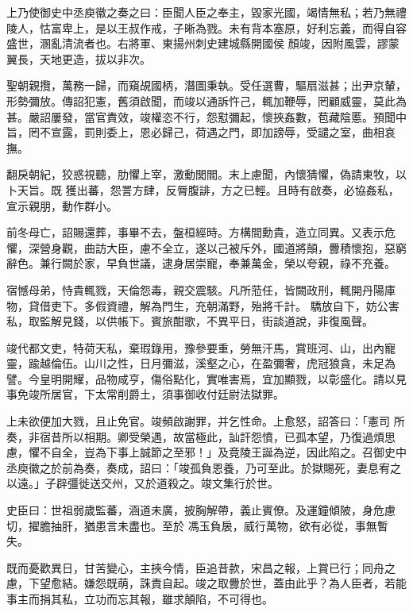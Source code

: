\begin{pinyinscope}
 上乃使御史中丞庾徽之奏之曰：臣聞人臣之奉主，毀家光國，竭情無私；若乃無禮陵人，怙富卑上，是以王叔作戒，子晰為戮。未有背本塞原，好利忘義，而得自容盛世，溷亂清流者也。右將軍、東揚州刺史建城縣開國侯
 顏竣，因附風雲，謬蒙翼長，天地更造，拔以非次。



 聖朝親攬，萬務一歸，而窺覘國柄，潛圖秉執。受任選曹，驅扇滋甚；出尹京輦，形勢彌放。傳詔犯憲，舊須啟聞，而竣以通訴忤己，輒加鞭辱，罔顧威靈，莫此為甚。嚴詔屢發，當官責效，竣權恣不行，怨懟彌起，懷挾姦數，苞藏陰慝。預聞中旨，罔不宣露，罰則委上，恩必歸己，荷遇之門，即加謗辱，受譴之室，曲相哀撫。



 翻戾朝紀，狡惑視聽，肋懼上宰，激動閭閻。末上慮聞，內懷猜懼，偽請東牧，以卜天旨。既
 獲出蕃，怨詈方肆，反脣腹誹，方之已輕。且時有啟奏，必協姦私，宣示親朋，動作群小。



 前冬母亡，詔賜還葬，事畢不去，盤桓經時。方構間勳貴，造立同異。又表示危懼，深營身觀，曲訪大臣，慮不全立，遂以己被斥外，國道將顛，釁積懷抱，惡窮辭色。兼行闕於家，早負世議，逮身居崇寵，奉兼萬金，榮以夸親，祿不充養。



 宿憾母弟，恃貴輒戮，天倫怨毒，親交震駭。凡所蒞任，皆闕政刑，輒開丹陽庫物，貸借吏下。多假資禮，解為門生，充朝滿野，殆將千計。
 驕放自下，妨公害私，取監解見錢，以供帳下。賓旅酣歌，不異平日，街談道說，非復風聲。



 竣代都文吏，特荷天私，棄瑕錄用，豫參要重，勞無汗馬，賞班河、山，出內寵靈，踰越倫伍。山川之性，日月彌滋，溪壑之心，在盈彌奢，虎冠狼貪，未足為譬。今皇明開耀，品物咸亨，傷俗點化，實唯害焉，宜加顯戮，以彰盛化。請以見事免竣所居官，下太常削爵土，須事御收付廷尉法獄罪。



 上未欲便加大戮，且止免官。竣頻啟謝罪，并乞性命。上愈怒，詔答曰：「憲司
 所奏，非宿昔所以相期。卿受榮遇，故當極此，訕訐怨憤，已孤本望，乃復過煩思慮，懼不自全，豈為下事上誠節之至邪！」及竟陵王誕為逆，因此陷之。召御史中丞庾徽之於前為奏，奏成，詔曰：「竣孤負恩養，乃可至此。於獄賜死，妻息宥之以遠。」子辟彊徙送交州，又於道殺之。竣文集行於世。



 史臣曰：世祖弱歲監蕃，涵道未廣，披胸解帶，義止賓僚。及運鐘傾陂，身危慮切，擢膽抽肝，猶患言未盡也。至於
 馮玉負扆，威行萬物，欲有必從，事無暫失。



 既而憂歡異日，甘苦變心，主挾今情，臣追昔款，宋昌之報，上賞已行；同舟之慮，下望愈結。嫌怨既萌，誅責自起。竣之取釁於世，蓋由此乎？為人臣者，若能事主而捐其私，立功而忘其報，雖求顛陷，不可得也。



\end{pinyinscope}